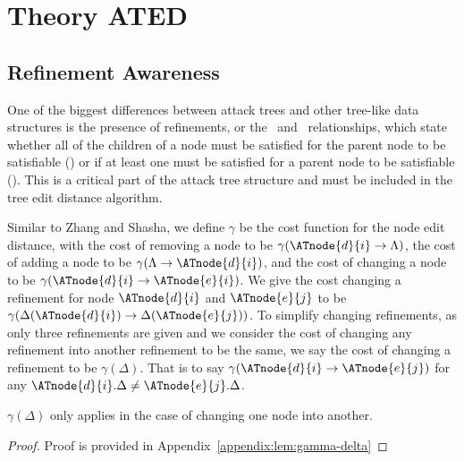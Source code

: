 \section{Theory ATED}

\subsection{Refinement Awareness}
\label{sec:refinement-awareness}

One of the biggest differences between attack trees and other tree-like data structures is the presence of refinements, or the \AND\ and \OR\ relationships, which state whether all of the children of a node must be satisfied for the parent node to be satisfiable (\AND) or if at least one must be satisfied for a parent node to be satisfiable (\OR). This is a critical part of the attack tree structure and must be included in the tree edit distance algorithm.




\begin{definition}\label{def:cost-function}
    Similar to Zhang and Shasha, we define $\gamma$ be the cost function for the node edit distance, with the cost of removing a node to be $\gamma(\ATnode{d}{i} \rightarrow {\Lambda})$, the cost of adding a node to be $\gamma({\Lambda}\rightarrow \ATnode{d}{i})$, and the cost of changing a node to be $\gamma(\ATnode{d}{i} \rightarrow \ATnode{e}{i})$. We give the cost changing a refinement for node  $\ATnode{d}{i}$ and $\ATnode{e}{j}$ to be $\gamma(\Delta(\ATnode{d}{i}) \rightarrow \Delta(\ATnode{e}{j}))$. To simplify changing refinements, as only three refinements are given and we consider the cost of changing any refinement into another refinement to be the same, we say the cost of changing a refinement to be $\gamma(\Delta)$. That is to say $\gamma(\ATnode{d}{i} \rightarrow \ATnode{e}{j})$ for any $\ATnode{d}{i}.\Delta \ne \ATnode{e}{j}.\Delta$.
\end{definition}



\begin{lemma}\label{lem:gamma-delta}

    $\gamma(\Delta)$ only applies in the case of changing one node into another.

  \begin{proof}
    Proof is provided in Appendix~\ref{appendix:lem:gamma-delta}
  \end{proof}

\end{lemma}




